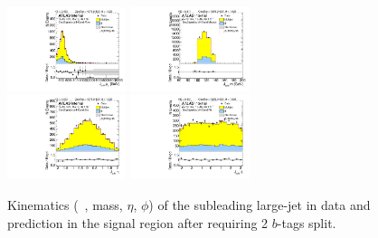 \begin{figure}[htbp!]
\begin{center}
\includegraphics[width=0.31\textwidth,angle=-90]{figures/boosted/Signal/b77_TwoTag_split_Signal_sublHCand_Pt_m.pdf}
\includegraphics[width=0.31\textwidth,angle=-90]{figures/boosted/Signal/b77_TwoTag_split_Signal_sublHCand_Mass_s.pdf}\\
\includegraphics[width=0.31\textwidth,angle=-90]{figures/boosted/Signal/b77_TwoTag_split_Signal_sublHCand_Eta.pdf}
\includegraphics[width=0.31\textwidth,angle=-90]{figures/boosted/Signal/b77_TwoTag_split_Signal_sublHCand_Phi.pdf}
  \caption{Kinematics (\pt~, mass, $\eta$, $\phi$) of the subleading large-\R jet in data and prediction in the signal region after requiring 2 $b$-tags split. }
  \label{fig:boosted-2bs-signal-ak10-subl}
\end{center}
\end{figure}

